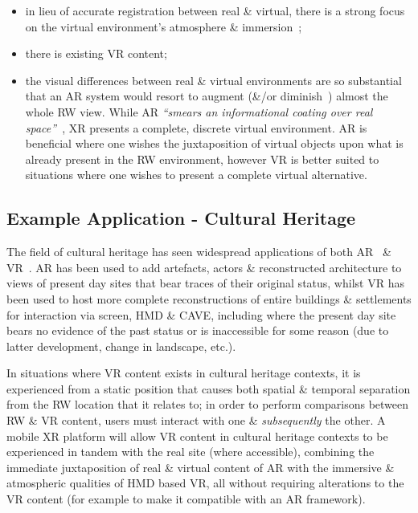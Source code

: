 \begin{itemize}
	\item in lieu of accurate registration between real \& virtual, there is a strong focus on the virtual environment's atmosphere \& immersion~\cite{deamicis:gamebased};
	\item there is existing VR content;
	\item the visual differences between real \& virtual environments are so substantial that an AR system would resort to augment (\&/or diminish~\cite{Mann2002}) almost the whole RW view. While AR \textit{``smears an informational coating over real space''}~\cite{Andersen}, XR presents a complete, discrete virtual environment. AR is beneficial where one wishes the juxtaposition of virtual objects upon what is already present in the RW environment, however VR is better suited to situations where one wishes to present a complete virtual alternative.
\end{itemize}

\subsection{Example Application - Cultural Heritage}
The field of cultural heritage has seen widespread applications of both AR~\cite{Kim2009, Wojciechowski2004, Okura2006, Magnenat-Thalmann2008a, vlahakis:archeoguide, Okura2011, Seo2010, benko:collaborative, Papagiannakis2004, Magnenat-Thalmann7, Papagiannakis2005, Papagiannakis2007, Papagiannakis2009, Taketomi2011, walczak:applications} \& VR~\cite{deamicis:gamebased, roussou:photorealism, cabral:x3dexperience, Roussou2002, Christou2006, willmott:largecomplex, Tzortzaki2002}. AR has been used to add artefacts, actors \& reconstructed architecture to views of present day sites that bear traces of their original status, whilst VR has been used to host more complete reconstructions of entire buildings \& settlements for interaction via screen, HMD \& CAVE, including where the present day site bears no evidence of the past status or is inaccessible for some reason (due to latter development, change in landscape, etc.).

In situations where VR content exists in cultural heritage contexts, it is experienced from a static position that causes both spatial \& temporal separation from the RW location that it relates to; in order to perform comparisons between RW \& VR content, users must interact with one \& \textit{subsequently} the other. A mobile XR platform will allow VR content in cultural heritage contexts to be experienced in tandem with the real site (where accessible), combining the immediate juxtaposition of real \& virtual content of AR with the immersive \& atmospheric qualities of HMD based VR, all without requiring alterations to the VR content (for example to make it compatible with an AR framework).

